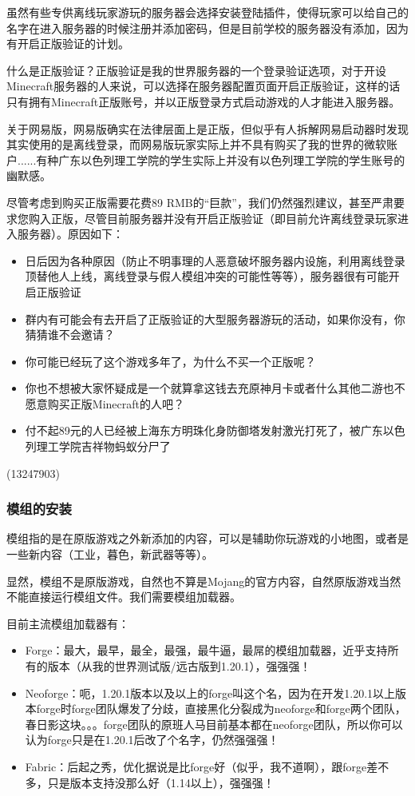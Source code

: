 \documentclass[
]{article}
\providecommand{\tightlist}{%
  \setlength{\itemsep}{0pt}\setlength{\parskip}{0pt}}
\begin{document}
虽然有些专供离线玩家游玩的服务器会选择安装登陆插件，使得玩家可以给自己的名字在进入服务器的时候注册并添加密码，但是目前学校的服务器没有添加，因为有开启正版验证的计划。

什么是正版验证？正版验证是我的世界服务器的一个登录验证选项，对于开设Minecraft服务器的人来说，可以选择在服务器配置页面开启正版验证，这样的话只有拥有Minecraft正版账号，并以正版登录方式启动游戏的人才能进入服务器。

关于网易版，网易版确实在法律层面上是正版，但似乎有人拆解网易启动器时发现其实使用的是离线登录，而网易版玩家实际上并不具有购买了我的世界的微软账户......有种广东以色列理工学院的学生实际上并没有以色列理工学院的学生账号的幽默感。

尽管考虑到购买正版需要花费89
RMB的``巨款''，我们仍然强烈建议，甚至严肃要求您购入正版，尽管目前服务器并没有开启正版验证（即目前允许离线登录玩家进入服务器）。原因如下：

\begin{itemize}
\tightlist
\item
  日后因为各种原因（防止不明事理的人恶意破坏服务器内设施，利用离线登录顶替他人上线，离线登录与假人模组冲突的可能性等等），服务器很有可能开启正版验证
\item
  群内有可能会有去开启了正版验证的大型服务器游玩的活动，如果你没有，你猜猜谁不会邀请？
\item
  你可能已经玩了这个游戏多年了，为什么不买一个正版呢？
\item
  你也不想被大家怀疑成是一个就算拿这钱去充原神月卡或者什么其他二游也不愿意购买正版Minecraft的人吧？
\item
  付不起89元的人已经被上海东方明珠化身防御塔发射激光打死了，被广东以色列理工学院吉祥物蚂蚁分尸了
\end{itemize}

\begin{flushright}(13247903)\end{flushright}

\subsubsection{模组的安装}\label{section-4}

模组指的是在原版游戏之外新添加的内容，可以是辅助你玩游戏的小地图，或者是一些新内容（工业，暮色，新武器等等）。

显然，模组不是原版游戏，自然也不算是Mojang的官方内容，自然原版游戏当然不能直接运行模组文件。我们需要模组加载器。

目前主流模组加载器有：

\begin{itemize}
\item
  Forge：最大，最早，最全，最强，最牛逼，最屌的模组加载器，近乎支持所有的版本（从我的世界测试版/远古版到1.20.1），强强强！
\item
  Neoforge：呃，1.20.1版本以及以上的forge叫这个名，因为在开发1.20.1以上版本forge时forge团队爆发了分歧，直接黑化分裂成为neoforge和forge两个团队，春日影这块。。。forge团队的原班人马目前基本都在neoforge团队，所以你可以认为forge只是在1.20.1后改了个名字，仍然强强强！
\item
  Fabric：后起之秀，优化据说是比forge好（似乎，我不道啊），跟forge差不多，只是版本支持没那么好（1.14以上），强强强！
\end{itemize}
\end{document}

